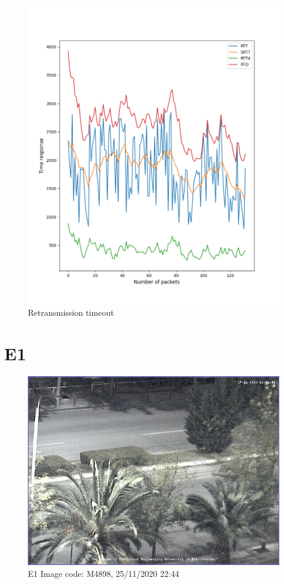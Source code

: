 \documentclass[hidelinks, 12pt, a4paper]{article}
\begin{document}
\begin{figure}[h!]
\centering
	\includegraphics[height=.38\textheight, width=\textwidth]{assets/session1/r1.png}
	\caption{Retransmission timeout} 
\end{figure}


\section{E1}

\begin{figure}[h!]
\centering
	\includegraphics[height=.38\textheight, width=\textwidth]{assets/session1/image_fix.jpg}
	\caption{E1 Image code: M4898, 25/11/2020 22:44} 
\end{figure}
\end{document}
